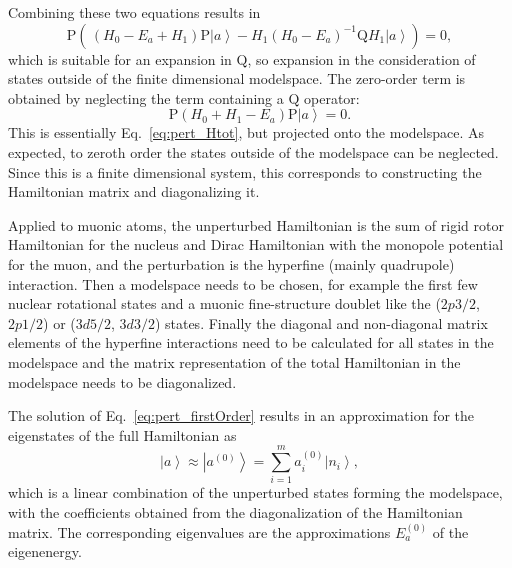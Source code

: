 Combining these two equations results in
\begin{equation}
\text{P}\left( \,
(H_0-E_a+H_1)\text{P}\left|a\right>
- H_1(H_0-E_a)^{-1}\text{Q}H_1\left|a\right>
\right) = 0,
\label{eq:pert_projectionEq}
\end{equation}
which is suitable for an expansion in $\text{Q}$, so expansion in the consideration of states outside of the finite dimensional modelspace. The zero-order term is obtained by neglecting the term containing a $\text{Q}$ operator:
\begin{equation}
\label{eq:pert_firstOrder}
\text{P}\left(H_0+H_1-E_a\right) \text{P}\left|a\right> = 0.
\end{equation}
This is essentially Eq.~\eqref{eq:pert_Htot}, but projected onto the modelspace. As expected, to zeroth order the states outside of the modelspace can be neglected. Since this is a finite dimensional system, this corresponds to constructing the Hamiltonian matrix and diagonalizing it.

Applied to muonic atoms, the unperturbed Hamiltonian is the sum of rigid rotor Hamiltonian for the nucleus and Dirac Hamiltonian with the monopole potential for the muon, and the perturbation is the hyperfine (mainly quadrupole) interaction. Then a modelspace needs to be chosen, for example the first few nuclear rotational states and a muonic fine-structure doublet like the ($2p3/2$, $2p1/2$) or ($3d5/2$, $3d3/2$) states. Finally the diagonal and non-diagonal matrix elements of the hyperfine interactions need to be calculated for all states in the modelspace and the matrix representation of the total Hamiltonian in the modelspace needs to be diagonalized.

The solution of Eq.~\eqref{eq:pert_firstOrder} results in an approximation for the eigenstates of the full Hamiltonian as
\begin{equation}
\label{eq:pert_firstOrderState}
\left|a\right>\approx \left|a^{(0)}\right> = \sum_{i=1}^m a_i^{(0)}\left|n_i\right>,
\end{equation}
which is a linear combination of the unperturbed states forming the modelspace, with the coefficients obtained from the diagonalization of the Hamiltonian matrix. The corresponding eigenvalues are the approximations $E_a^{(0)}$ of the eigenenergy.

